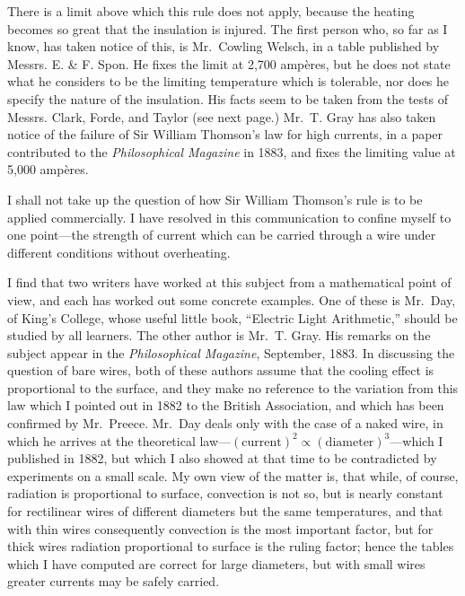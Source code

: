 \documentclass[12pt,oneside]{book}[2021/10/04]
\begin{document}
There is a limit above which this rule does not apply, because
the heating becomes so great that the insulation is injured. The
first person who, so far as I know, has taken notice of this, is
Mr.\ Cowling Welsch, in a table published by Messrs. E. \& F.
Spon. He fixes the limit at 2,700 ampères, but he does not state
what he considers to be the limiting temperature which is
tolerable, nor does he specify the nature of the insulation. His
facts seem to be taken from the tests of Messrs. Clark, Forde,
and Taylor (see next page.) Mr.\ T. Gray has also taken notice of
the failure of Sir William Thomson's law for high currents, in a
paper contributed to the \textit{Philosophical Magazine} in 1883, and
fixes the limiting value at 5,000 ampères.

I shall not take up the question of how Sir William Thomson's
rule is to be applied commercially. I have resolved in this
communication to confine myself to one point—the strength of
current which can be carried through a wire under different
conditions without overheating.

I find that two writers have worked at this subject from a
mathematical point of view, and each has worked out some concrete
examples. One of these is Mr.\ Day, of King's College,
whose useful little book, ``Electric Light Arithmetic,'' should be
studied by all learners. The other author is Mr.\ T. Gray. His
remarks on the subject appear in the \textit{Philosophical Magazine},
September, 1883. In discussing the question of bare wires, both of
these authors assume that the cooling effect is proportional to the
surface, and they make no reference to the variation from this law
which I pointed out in 1882 to the British Association, and which
has been confirmed by Mr.\ Preece. Mr.\ Day deals only with the
case of a naked wire, in which he arrives at the theoretical law—\(\mathrm{(current)^2
\propto (diameter)^3}\)—which I published in 1882, but which
I also showed at that time to be contradicted by experiments on
a small scale. My own view of the matter is, that while, of course,
radiation is proportional to surface, convection is not so, but is
nearly constant for rectilinear wires of different diameters but the
same temperatures, and that with thin wires consequently convection
is the most important factor, but for thick wires radiation
proportional to surface is the ruling factor; hence the tables
which I have computed are correct for large diameters, but with
small wires greater currents may be safely carried.
\end{document}
